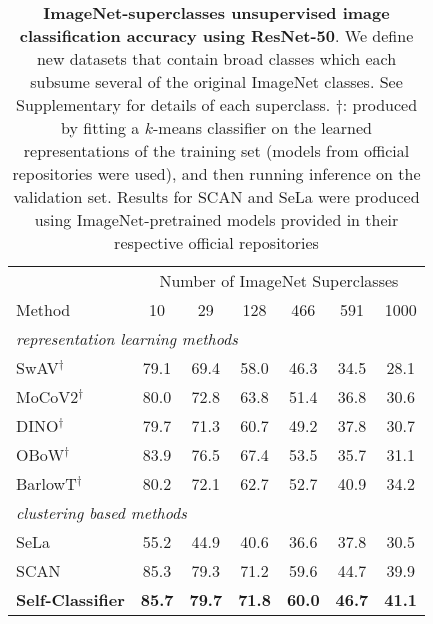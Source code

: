 \documentclass[runningheads]{llncs}
\begin{document}
\begin{table}[bt]
  \centering
  \setlength\tabcolsep{4pt}
    \caption{\textbf{ImageNet-superclasses unsupervised image classification accuracy using ResNet-50}. We define new datasets that contain broad classes which each subsume several of the original ImageNet classes. See Supplementary for details of each superclass. ${\dagger}$: produced by fitting a $k$-means classifier on the learned representations of the training set (models from official repositories were used), and then running inference on the validation set. Results for SCAN and SeLa were produced using ImageNet-pretrained models provided in their respective official repositories}
  \label{table:unsupervised_image_classification_superclasses}
  \begin{tabular}{lcccccc}
    \toprule
     & \multicolumn{6}{c}{Number of ImageNet Superclasses} \\
    Method & 10 & 29 & 128 & 466 & 591 & 1000 \\
    \midrule
    \multicolumn{7}{l}{\textit{representation learning methods}}\\
    SwAV$^{\dagger}$ \cite{caron2020unsupervised} & 79.1 & 69.4 & 58.0 & 46.3 & 34.5 & 28.1 \\
    MoCoV2$^{\dagger}$ \cite{chen2020improved} & 80.0 & 72.8 & 63.8 & 51.4 & 36.8 & 30.6 \\
    DINO$^{\dagger}$ \cite{caron2021emerging} & 79.7 & 71.3 & 60.7 & 49.2 & 37.8 & 30.7 \\
    OBoW$^{\dagger}$ \cite{gidaris2021obow} & 83.9 & 76.5 & 67.4 & 53.5 & 35.7 & 31.1 \\
    BarlowT$^{\dagger}$ \cite{DBLP:conf/icml/ZbontarJMLD21} & 80.2 & 72.1 & 62.7 & 52.7 & 40.9 & 34.2 \\
    \midrule
    \midrule
    \multicolumn{7}{l}{\textit{clustering based methods}}\\
    SeLa \cite{YM.2020Self-labelling} & 55.2 & 44.9 & 40.6 & 36.6 & 37.8 & 30.5 \\
    SCAN \cite{van2020scan} & 85.3 & 79.3 & 71.2 & 59.6 & 44.7 & 39.9 \\
    \midrule
    \textbf{Self-Classifier} & \textbf{85.7} & \textbf{79.7} & \textbf{71.8} & \textbf{60.0} & \textbf{46.7} & \textbf{41.1} \\
    \bottomrule
  \end{tabular}
\end{table}
\end{document}

